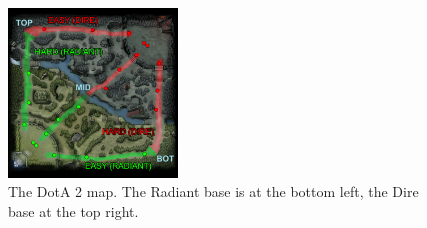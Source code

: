 \documentclass[letterpaper, 10 pt, conference]{ieeeconf}  %
\begin{document}
\begin{figure}[h]
\begin{center}
\includegraphics[width=0.4\textwidth]{600px-Minimap_Lanes.png}
\caption{The DotA 2 map. The Radiant base is at the bottom left, the Dire base at the top right.}
\end{center}
\end{figure}
\end{document}
